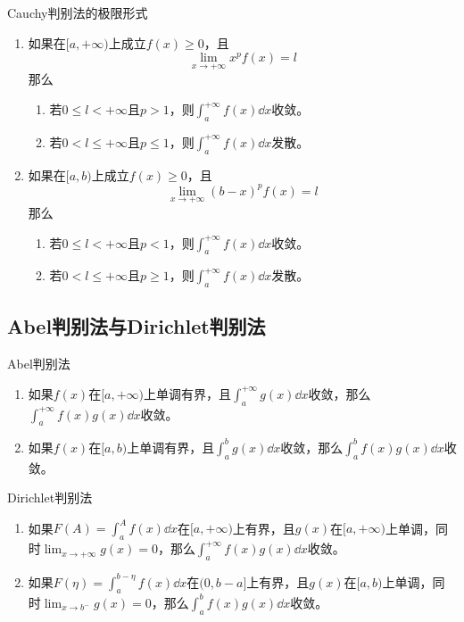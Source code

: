 \documentclass[lang = cn, scheme = chinese, thmcnt = section]{elegantbook}
\begin{document}
\begin{theorem}{Cauchy判别法的极限形式}
	\begin{enumerate}
		\item 如果在$[a,+\infty)$上成立$f(x)\ge 0$，且
		$$
		\lim_{x\to+\infty}x^pf(x)=l
		$$
		那么
		\begin{enumerate}
			\item 若$0\le l <+\infty$且$p>1$，则$\displaystyle \int_a^{+\infty}f(x)\dd x$收敛。
			\item 若$0<l \le+\infty$且$p\le 1$，则$\displaystyle \int_a^{+\infty}f(x)\dd x$发散。
		\end{enumerate}
		\item 如果在$[a,b)$上成立$f(x)\ge 0$，且
		$$
		\lim_{x\to+\infty}(b-x)^pf(x)=l
		$$
		那么
		\begin{enumerate}
			\item 若$0\le l <+\infty$且$p<1$，则$\displaystyle \int_a^{+\infty}f(x)\dd x$收敛。
			\item 若$0<l \le+\infty$且$p\ge 1$，则$\displaystyle \int_a^{+\infty}f(x)\dd x$发散。
		\end{enumerate}
	\end{enumerate}
\end{theorem}

\subsection{Abel判别法与Dirichlet判别法}

\begin{theorem}{Abel判别法}
	\begin{enumerate}
		\item 如果$f(x)$在$[a,+\infty)$上单调有界，且$\displaystyle \int_a^{+\infty}g(x)\dd x$收敛，那么$\displaystyle \int_a^{+\infty}f(x)g(x)\dd x$收敛。
		\item 如果$f(x)$在$[a,b)$上单调有界，且$\displaystyle \int_a^{b}g(x)\dd x$收敛，那么$\displaystyle \int_a^bf(x)g(x)\dd x$收敛。
	\end{enumerate}
\end{theorem}

\begin{theorem}{Dirichlet判别法}
	\begin{enumerate}
		\item 如果$\displaystyle F(A)=\int_a^{A}f(x)\dd x$在$[a,+\infty)$上有界，且$g(x)$在$[a,+\infty)$上单调，同时$\displaystyle \lim_{x\to +\infty}g(x)=0$，那么$\displaystyle \int_a^{+\infty}f(x)g(x)\dd x$收敛。
		\item 如果$\displaystyle F(\eta)=\int_a^{b-\eta}f(x)\dd x$在$(0,b-a]$上有界，且$g(x)$在$[a,b)$上单调，同时$\displaystyle \lim_{x\to b^-}g(x)=0$，那么$\displaystyle \int_a^{b}f(x)g(x)\dd x$收敛。
	\end{enumerate}
\end{theorem}
\end{document}
